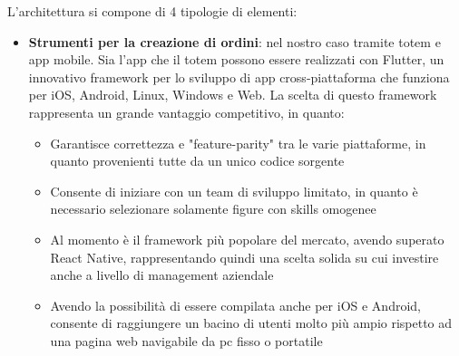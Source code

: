 \documentclass[a4paper, titlepage, 12pt, openright, twoside]{book}
\begin{document}
L'architettura si compone di 4 tipologie di elementi:
\begin{itemize}
	\item \textbf{Strumenti per la creazione di ordini}: nel nostro caso tramite totem e app mobile. Sia l'app che il totem possono essere realizzati con Flutter, un innovativo
				 framework per lo sviluppo di app cross-piattaforma che funziona per iOS, Android, Linux, Windows e Web. La scelta di questo framework rappresenta un grande
				 vantaggio competitivo, in quanto:
				 \begin{itemize}
				 	\item Garantisce correttezza e "feature-parity" tra le varie piattaforme, in quanto provenienti tutte da un unico codice sorgente
				 	\item Consente di iniziare con un team di sviluppo limitato, in quanto è necessario selezionare solamente figure con skills omogenee
				 	\item Al momento è il framework più popolare del mercato, avendo superato React Native, rappresentando quindi una scelta solida su cui investire anche a livello
				 		  di management aziendale \cite{flutterreact}
				    \item Avendo la possibilità di essere compilata anche per iOS e Android, consente di raggiungere un bacino di utenti molto più ampio rispetto ad una pagina web
				    	  navigabile da pc fisso o portatile \cite{hardwaremob}
				 \end{itemize}
				 

\end{itemize}
\end{document}
